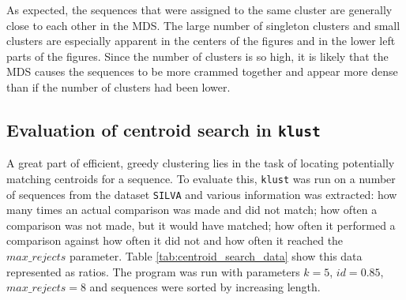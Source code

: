As expected, the sequences that were assigned to the same cluster are generally
close to each other in the MDS. The large number of singleton clusters and
small clusters are especially apparent in the centers of the figures and in the
lower left parts of the figures. Since the number of clusters is so high, it is
likely that the MDS causes the sequences to be more crammed together and appear
more dense than if the number of clusters had been lower.


\subsection{Evaluation of centroid search in \texttt{klust}}
\label{sec:evaluation_centroid_search}

A great part of efficient, greedy clustering lies in the task of locating
potentially matching centroids for a sequence. To evaluate this, \texttt{klust}
was run on a number of sequences from the dataset \texttt{SILVA} and various
information was extracted: how many times an actual comparison was made and did
not match; how often a comparison was not made, but it would have matched; how
often it performed a comparison against how often it did not and how often it
reached the $max\_rejects$ parameter. Table \ref{tab:centroid_search_data} show
this data represented as ratios. The program was run with parameters $k=5$,
$id=0.85$, $max\_rejects=8$ and sequences were sorted by increasing length.

